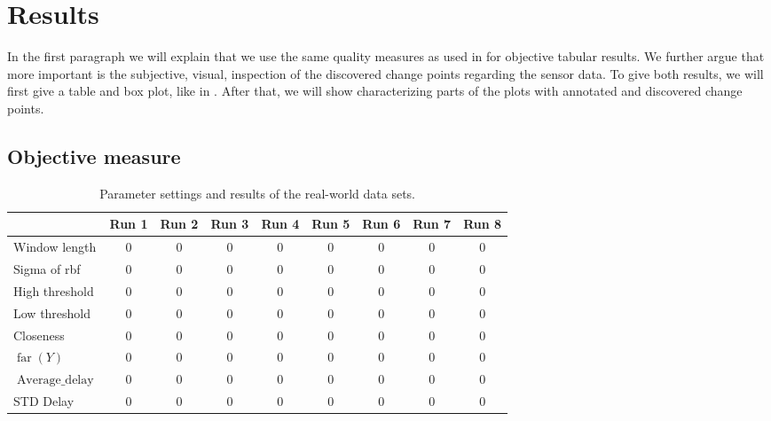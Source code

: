 \section{Results}\label{sec:real_world_results}

In the first paragraph we will explain that we use the same quality measures as used in  for objective tabular results.
We further argue that more important is the subjective, visual, inspection of the discovered change points regarding the sensor data.
To give both results, we will first give a table and box plot, like in .
After that, we will show characterizing parts of the plots with annotated and discovered change points.

\subsection{Objective measure}


\begin{table}
  \centering
  \begin{tabulary}{\textwidth}{|l|c|c|c|c|c|c|c|c|}
     & Run 1 & Run 2 & Run 3 & Run 4 & Run 5 & Run 6 & Run 7 & Run 8 \\
    \hline
    Window length & 0 & 0 & 0 & 0 & 0 & 0 & 0 & 0 \\
    \hline
    Sigma of \gls{rbf} & 0 & 0 & 0 & 0 & 0 & 0 & 0 & 0 \\
    \hline
    High threshold & 0 & 0 & 0 & 0 & 0 & 0 & 0 & 0 \\
    \hline
    Low threshold & 0 & 0 & 0 & 0 & 0 & 0 & 0 & 0 \\
    \hline
    Closeness & 0 & 0 & 0 & 0 & 0 & 0 & 0 & 0 \\
    \hline
    \hline
    $\operatorname*{far}(Y)$ & 0 & 0 & 0 & 0 & 0 & 0 & 0 & 0 \\
    \hline
    $\operatorname*{Average\_delay}$ & 0 & 0 & 0 & 0 & 0 & 0 & 0 & 0 \\
    \hline
    STD Delay & 0 & 0 & 0 & 0 & 0 & 0 & 0 & 0 \\
    \hline
  \end{tabulary}
  \caption[Results real world runs]{Parameter settings and results of the real-world data sets.}
  \label{tab:results_real_world}
\end{table}

